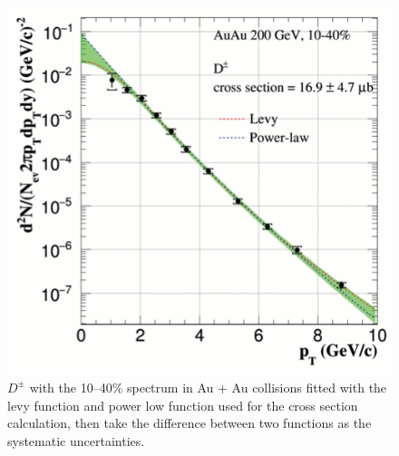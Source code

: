 \begin{figure}[htbp]
\begin{minipage}[htbp]{0.47\linewidth}
\includegraphics[width=1.0\textwidth,angle=0]{figure/Run14_D0HFT/ccx_2.png}
\caption{$D^{\pm}$ with the 10--40\% spectrum in Au + Au collisions fitted with the levy function and power low function used for the cross section calculation, then take the difference between two functions as the systematic uncertainties. \label{ccx_2}}
\end{minipage}
\end{figure}


